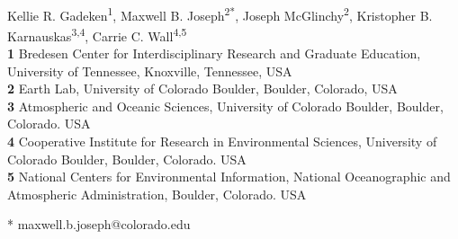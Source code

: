 \documentclass[10pt,letterpaper]{article}
\begin{document}
\vspace*{0.2in}

\begin{flushleft}
{\Large
\textbf{} %
}
\newline
\\
Kellie R. Gadeken\textsuperscript{1},
Maxwell B. Joseph\textsuperscript{2*},
Joseph McGlinchy\textsuperscript{2},
Kristopher B. Karnauskas\textsuperscript{3,4},
Carrie C. Wall\textsuperscript{4,5}\\
\bigskip
\textbf{1} Bredesen Center for Interdisciplinary Research and Graduate Education, University of Tennessee, Knoxville, Tennessee, USA
\\
\textbf{2} Earth Lab, University of Colorado Boulder, Boulder, Colorado, USA
\\
\textbf{3} Atmospheric and Oceanic Sciences, University of Colorado Boulder, Boulder, Colorado. USA
\\
\textbf{4} Cooperative Institute for Research in Environmental Sciences, University of Colorado Boulder, Boulder, Colorado. USA
\\
\textbf{5} National Centers for Environmental Information, National Oceanographic and Atmospheric Administration, Boulder, Colorado. USA
\\
\bigskip


* maxwell.b.joseph@colorado.edu

\end{flushleft}
\end{document}
